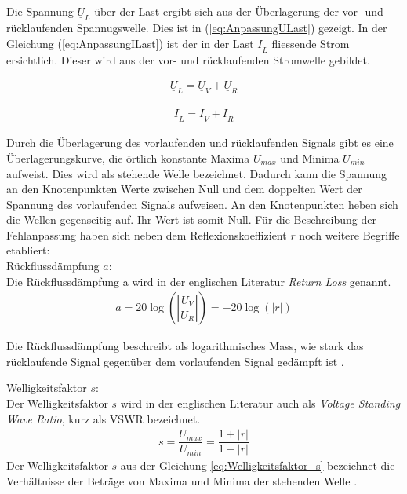Die Spannung $\underline{U}_L$ über der Last ergibt sich  aus der Überlagerung der vor- und  rücklaufenden Spannugswelle. Dies ist in   (\ref{eq:AnpassungULast}) gezeigt. In der Gleichung (\ref{eq:AnpassungILast}) ist der in der Last $\underline{I}_L$  fliessende Strom ersichtlich. Dieser wird aus der vor- und rücklaufenden Stromwelle gebildet\cite{Tekom}.


\begin{eqnarray}\label{eq:AnpassungULast}
\underline{U}_L = \underline{U}_V + \underline{U}_R
\end{eqnarray}

\begin{eqnarray}\label{eq:AnpassungILast}
\underline{I}_L = \underline{I}_V + \underline{I}_R
\end{eqnarray}

Durch die Überlagerung des vorlaufenden und rücklaufenden Signals gibt es eine Überlagerungskurve, die örtlich konstante Maxima $U_{max}$ und Minima $U_{min}$ aufweist. Dies wird als stehende Welle bezeichnet. Dadurch kann die Spannung an den Knotenpunkten Werte zwischen Null und dem doppelten Wert der Spannung des vorlaufenden Signals aufweisen. An den Knotenpunkten heben sich die Wellen gegenseitig auf. Ihr Wert ist somit Null. Für die Beschreibung der Fehlanpassung haben sich neben dem Reflexionskoeffizient  $r$ noch weitere Begriffe etabliert:\\

Rückflussdämpfung $a$:\\
Die Rückflussdämpfung a wird in der englischen Literatur \textit{Return Loss} genannt.
\begin{eqnarray}\label{eq:Ruckflussdämpfung_a}
a=20\log\left(\left| \dfrac{U_V}{U_R}\right| \right)=-20\log(|r|)
\end{eqnarray}

Die Rückflussdämpfung beschreibt als logarithmisches Mass, wie stark das rücklaufende Signal gegenüber dem vorlaufenden Signal gedämpft ist \cite{Tekom}.\\

Welligkeitsfaktor $s$:\\
Der Welligkeitsfaktor $s$ wird in der englischen Literatur auch als \textit{Voltage Standing Wave Ratio}, kurz als VSWR bezeichnet.
\begin{eqnarray}\label{eq:Welligkeitsfaktor_s}
s=\dfrac{U_{max}}{U_{min}}=\dfrac{1+|r|}{1-|r|}
\end{eqnarray}
Der Welligkeitsfaktor $s$ aus der Gleichung \ref{eq:Welligkeitsfaktor_s} bezeichnet die Verhältnisse der Beträge von Maxima und Minima der stehenden Welle \cite{Tekom}.\\


